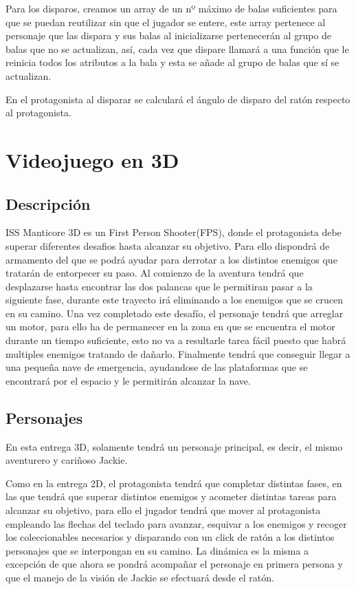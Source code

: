 Para los disparos, creamos un array de un nº máximo de balas suficientes para que se puedan reutilizar sin que el jugador se entere, este array pertenece al personaje que las dispara y sus balas al inicializarse pertenecerán al grupo de balas que no se actualizan, así, cada vez que dispare llamará a una función que le reinicia todos los atributos a la bala y esta se añade al grupo de balas que sí se actualizan. 

En el protagonista al disparar se calculará el ángulo de disparo del ratón respecto al protagonista. 

\section{Videojuego en 3D}

\subsection{Descripción}
ISS Manticore 3D es un First Person Shooter(FPS), donde el protagonista debe superar diferentes desafios hasta alcanzar su objetivo. Para ello dispondrá de armamento del que se podrá ayudar para derrotar a los distintos enemigos que tratarán de entorpecer su paso. Al comienzo de la aventura tendrá que desplazarse hasta encontrar las dos palancas que le permitiran pasar a la siguiente fase, durante este trayecto irá eliminando a los enemigos que se crucen en su camino. Una vez completado este desafío, el personaje tendrá que arreglar un motor, para ello ha de permanecer en la zona en que se encuentra el motor durante un tiempo suficiente, esto no va a resultarle tarea fácil puesto que habrá multiples enemigos tratando de dañarlo. Finalmente tendrá que conseguir llegar a una pequeña nave de emergencia, ayudandose de las plataformas que se encontrará por el espacio y le permitirán alcanzar la nave. 

\subsection{Personajes}

En esta entrega 3D, solamente tendrá un personaje principal, es decir, el mismo aventurero y cariñoso Jackie.

Como en la entrega 2D, el protagonista tendrá que completar distintas fases, en las que tendrá que superar distintos enemigos y acometer distintas tareas para alcanzar su objetivo, para ello el jugador tendrá que mover al protagonista empleando las flechas del teclado para avanzar, esquivar a los enemigos y recoger los coleccionables necesarios y disparando con un click de ratón a los distintos personajes que se interpongan en su camino. La dinámica es la misma a excepción de que ahora se pondrá acompañar el personaje en primera persona y que el manejo de la visión de Jackie se efectuará desde el ratón.

